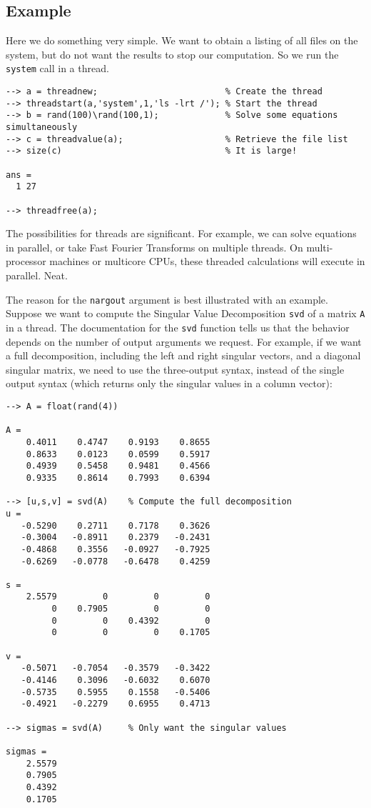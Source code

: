 \subsection{Example}

Here we do something very simple.  We want to obtain a listing of
all files on the system, but do not want the results to stop our
computation.  So we run the \verb|system| call in a thread.
\begin{verbatim}
--> a = threadnew;                         % Create the thread
--> threadstart(a,'system',1,'ls -lrt /'); % Start the thread
--> b = rand(100)\rand(100,1);             % Solve some equations simultaneously
--> c = threadvalue(a);                    % Retrieve the file list
--> size(c)                                % It is large!

ans = 
  1 27 

--> threadfree(a);
\end{verbatim}
The possibilities for threads are significant.  For example,
we can solve equations in parallel, or take Fast Fourier Transforms
on multiple threads.  On multi-processor machines or multicore CPUs,
these threaded calculations will execute in parallel.  Neat.

The reason for the  \verb|nargout| argument is best illustrated with
an example.  Suppose we want to compute the Singular Value 
Decomposition \verb|svd| of a matrix \verb|A| in a thread.  
The documentation for the \verb|svd| function tells us that
the behavior depends on the number of output arguments we request.
For example, if we want a full decomposition, including the left 
and right singular vectors, and a diagonal singular matrix, we
need to use the three-output syntax, instead of the single output
syntax (which returns only the singular values in a column vector):
\begin{verbatim}
--> A = float(rand(4))

A = 
    0.4011    0.4747    0.9193    0.8655 
    0.8633    0.0123    0.0599    0.5917 
    0.4939    0.5458    0.9481    0.4566 
    0.9335    0.8614    0.7993    0.6394 

--> [u,s,v] = svd(A)    % Compute the full decomposition
u = 
   -0.5290    0.2711    0.7178    0.3626 
   -0.3004   -0.8911    0.2379   -0.2431 
   -0.4868    0.3556   -0.0927   -0.7925 
   -0.6269   -0.0778   -0.6478    0.4259 

s = 
    2.5579         0         0         0 
         0    0.7905         0         0 
         0         0    0.4392         0 
         0         0         0    0.1705 

v = 
   -0.5071   -0.7054   -0.3579   -0.3422 
   -0.4146    0.3096   -0.6032    0.6070 
   -0.5735    0.5955    0.1558   -0.5406 
   -0.4921   -0.2279    0.6955    0.4713 

--> sigmas = svd(A)     % Only want the singular values

sigmas = 
    2.5579 
    0.7905 
    0.4392 
    0.1705 
\end{verbatim}


